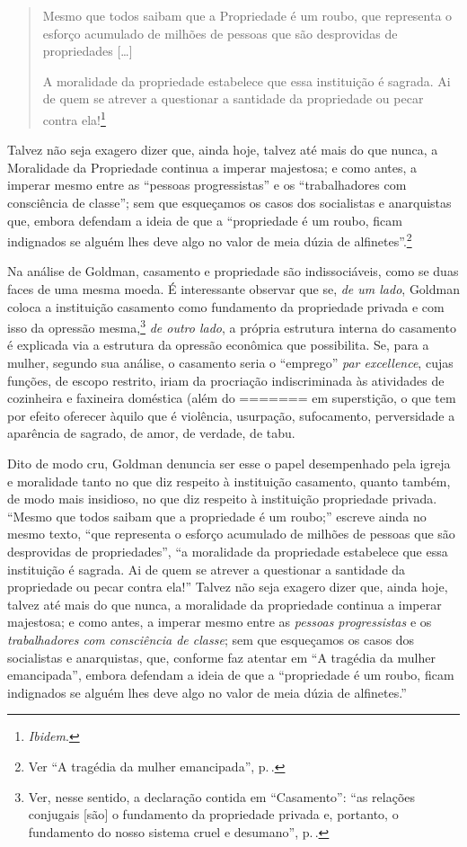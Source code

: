 \begin{quote}
Mesmo que todos saibam que a
Propriedade é um roubo, que representa o esforço acumulado de milhões de
pessoas que são desprovidas de propriedades {[}\ldots{]}

A moralidade da propriedade estabelece que essa
instituição é sagrada. Ai de quem se atrever a questionar a santidade da
propriedade ou pecar contra ela!\footnote{\textit{Ibidem}.} 
\end{quote}

Talvez não seja exagero
dizer que, ainda hoje, talvez até mais do que nunca, a Moralidade da
Propriedade continua a imperar majestosa; e como antes, a imperar mesmo
entre as ``pessoas progressistas'' e os ``trabalhadores com consciência
de classe''; sem que esqueçamos os casos dos socialistas e anarquistas
que, embora defendam a ideia de que a ``propriedade é um roubo, ficam indignados se
alguém lhes deve algo no valor de meia dúzia de alfinetes''.\footnote{Ver ``A tragédia da mulher emancipada'', p.\,\pageref{alfinete}.}

Na análise de Goldman, casamento e propriedade são indissociáveis, como
se duas faces de uma mesma moeda. É interessante observar que se,
\emph{de um lado}, Goldman coloca a instituição casamento como
fundamento da propriedade privada e com isso da opressão mesma,\footnote{Ver,
nesse sentido, a declaração contida em ``Casamento'': ``as relações
conjugais {[}são{]} o fundamento da propriedade privada e, portanto, o
fundamento do nosso sistema cruel e desumano'', p.\,\pageref{cruel}.} \emph{de outro lado},
a própria estrutura interna do casamento é explicada via a estrutura da
opressão econômica que possibilita. Se, para a mulher, segundo sua
análise, o casamento seria o ``emprego'' \emph{par excellence}, cujas
funções, de escopo restrito, iriam da procriação indiscriminada
às atividades de cozinheira e faxineira doméstica (além do
=======
em superstição, o que tem por efeito oferecer àquilo que é violência,
usurpação, sufocamento, perversidade a aparência de sagrado, de amor, de
verdade, de tabu. 

Dito de modo cru, Goldman denuncia ser esse o papel
desempenhado pela igreja e moralidade tanto no que diz respeito à
instituição casamento, quanto também, de modo mais insidioso, no que diz
respeito à instituição propriedade privada. ``Mesmo que todos saibam que
a propriedade é um roubo;'' escreve ainda no mesmo texto,
``que representa o esforço acumulado de milhões de pessoas que são
desprovidas de propriedades'', ``a moralidade da propriedade estabelece
que essa instituição é sagrada. Ai de quem se atrever a questionar a
santidade da propriedade ou pecar contra ela!'' Talvez não seja exagero
dizer que, ainda hoje, talvez até mais do que nunca, a moralidade da
propriedade continua a imperar majestosa; e como antes, a imperar mesmo
entre as \textit{pessoas progressistas} e os \textit{trabalhadores com consciência
de classe}; sem que esqueçamos os casos dos socialistas e anarquistas,
que, conforme faz atentar em ``A tragédia da mulher emancipada'', embora
defendam a ideia de que a ``propriedade é um roubo, ficam indignados se
alguém lhes deve algo no valor de meia dúzia de alfinetes.''

